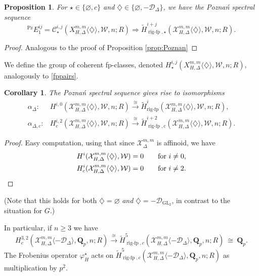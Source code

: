 \documentclass[cjm]{ipart}
\theoremstyle{plain}
\newtheorem{proposition}[theorem]{Proposition}
\newtheorem{corollary}[theorem]{Corollary}
\theoremstyle{remark}
\DeclareMathOperator{\GL}{GL}
\DeclareMathOperator{\Pz}{Pz}
\DeclareMathOperator{\rigfp}{rig-fp}
\newcommand{\QQ}{\mathbf{Q}}
\newcommand{\Qp}{\QQ_p}
\newcommand{\cD}{\mathcal{D}}
\newcommand{\cW}{\mathcal{W}}
\newcommand{\cX}{\mathcal{X}}
\newcommand{\rig}{\mathrm{rig}}
\newcommand{\sC}{\mathscr{C}}
\newcommand{\wH}{\widetilde{H}}
\numberwithin{equation}{subsection}
\renewcommand{\geq}{\geqslant}
\begin{document}
  \begin{proposition}\label{prop:PoznanH}
   For $\star\in\{\varnothing,c\}$ and $\diamondsuit\in\{\varnothing,-\cD_\Delta\}$, we have the \emph{Pozna\'n spectral sequence}
   \[ {}^{\Pz}E_1^{ij}= \sC^{i,j}_{\star}(X_{H,\Delta}^{m,m}\langle \diamondsuit\rangle, \cW,n;R) \Rightarrow \wH^{i+j}_{\rigfp,\star}(\cX^{m,m}_{H,\Delta}\langle \diamondsuit\rangle,\cW,n;R).\]
  \end{proposition}
  \begin{proof}
   Analogous to the proof of Proposition \ref{prop:Poznan}
  \end{proof}

  We define the group of coherent fp-classes, denoted $H^{i,j}_{\star}(X_{H,\Delta}^{m,m}\langle \diamondsuit\rangle, \cW,n;R)$, analogously to \cref{fppairs}.

  \begin{corollary}\label{cor:HGrosisoms}
   The Pozna\'n spectral sequence gives rise to isomorphisms
   \begin{align*}
     \alpha_\Delta: &H^{i,0}(\cX^{m,m}_{H,\Delta}\langle \diamondsuit\rangle, \cW, n;R) \xrightarrow{\,\cong\,} \wH^i_{\rigfp}(\cX^{m,m}_{H,\Delta}\langle \diamondsuit\rangle, \cW, n;R) ,\\
     \alpha_{\Delta,c}: &H_c^{i,2}(\cX^{m,m}_{H,\Delta}\langle \diamondsuit\rangle, \cW, n;R) \xrightarrow{\,\cong\,} \wH^{i+2}_{\rigfp,c}(\cX^{m,m}_{H,\Delta}\langle \diamondsuit\rangle, \cW,n;R) .
   \end{align*}
  \end{corollary}
  
  \begin{proof}
   Easy computation, using that since $\cX^{m,m}_\Delta$ is affinoid, we have
   \begin{align*}
    H^i(\cX^{m,m}_{H,\Delta}\langle\diamondsuit\rangle,\cW)=0 & \qquad \text{for $i\neq 0$,}\\
    H^i_c(\cX^{m,m}_{H,\Delta}\langle\diamondsuit\rangle,\cW)=0 & \qquad \text{for $i\neq 2$}.\qedhere
   \end{align*}
  \end{proof}

  (Note that this holds for both $\diamondsuit=\varnothing$ \emph{and} $\diamondsuit=-\cD_{\GL_2}$, in contrast to the situation for $G$.)

  \begin{note}\label{note:highestfpclassphiaction}
   In particular, if $n\geq 3$ we have
   \[ H_c^{3,2}(\cX^{m,m}_{H,\Delta}\langle -\cD_\Delta\rangle, \Qp, n;R) \xrightarrow{\ \cong\ } \wH^{5}_{\rigfp,c}(\cX^{m,m}_{H,\Delta}\langle -\cD_\Delta\rangle, \Qp,n;R)
     \ \cong\ 
     \Qp.\]
   The Frobenius operator $\varphi_H^\star$ acts on $\wH^{5}_{\rigfp,c}(\cX^{m,m}_{H,\Delta}\langle -\cD_\Delta\rangle, \Qp,n;R)$ as multiplication by $p^2$.
  \end{note}
\end{document}
